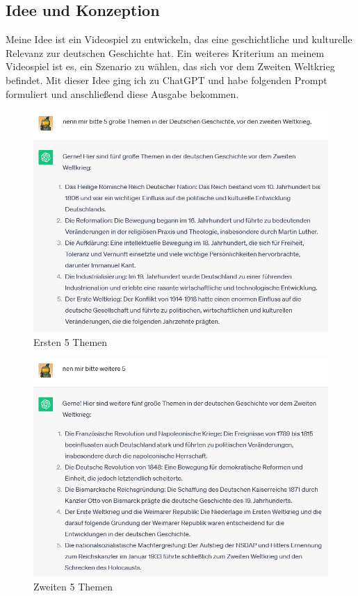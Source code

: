 \documentclass[10pt,a4paper,bibliography=totocnumbered,listof=totocnumbered]{scrartcl}
\begin{document}
\subsection {Idee und Konzeption}
Meine Idee ist ein Videospiel zu entwickeln, das eine geschichtliche und kulturelle Relevanz zur deutschen Geschichte hat. Ein weiteres Kriterium an meinem Videospiel ist es, ein Szenario zu wählen, das sich vor dem Zweiten Weltkrieg befindet. Mit dieser Idee ging ich zu ChatGPT und habe folgenden Prompt formuliert und anschließend diese Ausgabe bekommen.
\begin{figure}[h]
        	\centering
\includegraphics[width=14cm]{BilderFuerBA/CGPTBachelorarbeitZurKI/01.png}
        	\caption{Ersten 5 Themen}
        	\label{fig:ersten-5-themen}
\end{figure}
\begin{figure}[h]
        	\centering
\includegraphics[width=14cm]{BilderFuerBA/CGPTBachelorarbeitZurKI/02.png}
        	\caption{Zweiten 5 Themen}
        	\label{fig:zweiten-5-themen}
\end{figure}
\end{document}
